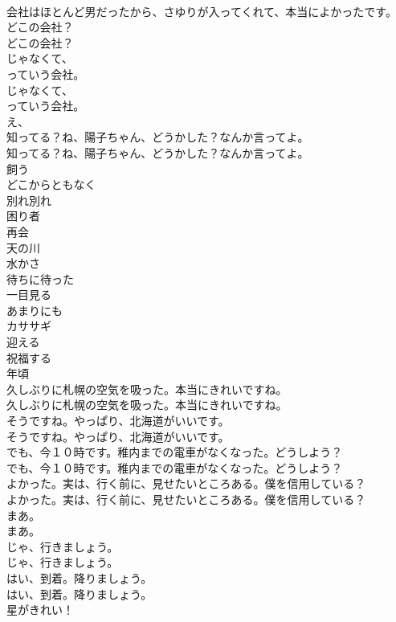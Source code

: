 \documentclass[8pt]{extreport}
\begin{document}
\begin{CJK}{UTF8}{min}
\\	会社はほとんど男だったから、さゆりが入ってくれて、本当によかったです。 
\\	どこの会社？	
\\	どこの会社？ 
\\	じゃなくて、
\\	っていう会社。	
\\	じゃなくて、
\\	っていう会社。 
\\	え、
\\	知ってる？ね、陽子ちゃん、どうかした？なんか言ってよ。	
\\	知ってる？ね、陽子ちゃん、どうかした？なんか言ってよ。 
\\	飼う
\\	どこからともなく
\\	別れ別れ
\\	困り者
\\	再会
\\	天の川
\\	水かさ
\\	待ちに待った
\\	一目見る
\\	あまりにも
\\	カササギ
\\	迎える
\\	祝福する
\\	年頃
\\	久しぶりに札幌の空気を吸った。本当にきれいですね。	
\\	久しぶりに札幌の空気を吸った。本当にきれいですね。 
\\	そうですね。やっぱり、北海道がいいです。	
\\	そうですね。やっぱり、北海道がいいです。 
\\	でも、今１０時です。稚内までの電車がなくなった。どうしよう？	
\\	でも、今１０時です。稚内までの電車がなくなった。どうしよう？ 
\\	よかった。実は、行く前に、見せたいところある。僕を信用している？	
\\	よかった。実は、行く前に、見せたいところある。僕を信用している？ 
\\	まあ。	
\\	まあ。 
\\	じゃ、行きましょう。	
\\	じゃ、行きましょう。 
\\	はい、到着。降りましょう。	
\\	はい、到着。降りましょう。 
\\	星がきれい！	

\end{CJK}
\end{document}
